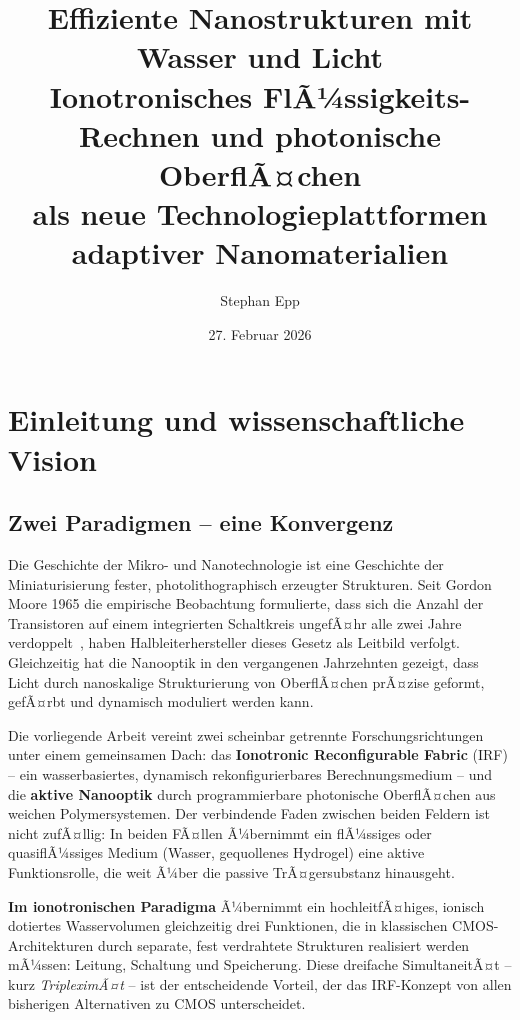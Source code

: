 ﻿\documentclass[a4paper,12pt]{scrreprt}
\title{\textbf{Effiziente Nanostrukturen mit\\ Wasser und Licht}\\[0.8ex]
  \large Ionotronisches FlÃ¼ssigkeits-Rechnen und photonische OberflÃ¤chen\\
  als neue Technologieplattformen adaptiver Nanomaterialien}
\author{Stephan Epp}
\date{27. Februar 2026}
\theoremstyle{definition}
\begin{document}
\maketitle
\tableofcontents
\newpage

\section{Einleitung und wissenschaftliche Vision}

\subsection{Zwei Paradigmen -- eine Konvergenz}

Die Geschichte der Mikro- und Nanotechnologie ist eine Geschichte der
Miniaturisierung fester, photolithographisch erzeugter Strukturen. Seit
Gordon Moore 1965 die empirische Beobachtung formulierte, dass sich die
Anzahl der Transistoren auf einem integrierten Schaltkreis ungefÃ¤hr alle
zwei Jahre verdoppelt~\cite{moore1965}, haben Halbleiterhersteller dieses
Gesetz als Leitbild verfolgt. Gleichzeitig hat die Nanooptik in den
vergangenen Jahrzehnten gezeigt, dass Licht durch nanoskalige Strukturierung
von OberflÃ¤chen prÃ¤zise geformt, gefÃ¤rbt und dynamisch moduliert werden kann.

Die vorliegende Arbeit vereint zwei scheinbar getrennte Forschungsrichtungen
unter einem gemeinsamen Dach: das \textbf{Ionotronic Reconfigurable Fabric}
(IRF) -- ein wasserbasiertes, dynamisch rekonfigurierbares Berechnungsmedium
-- und die \textbf{aktive Nanooptik} durch programmierbare photonische
OberflÃ¤chen aus weichen Polymersystemen. Der verbindende Faden zwischen
beiden Feldern ist nicht zufÃ¤llig: In beiden FÃ¤llen Ã¼bernimmt ein flÃ¼ssiges
oder quasiflÃ¼ssiges Medium (Wasser, gequollenes Hydrogel) eine aktive
Funktionsrolle, die weit Ã¼ber die passive TrÃ¤gersubstanz hinausgeht.

\textbf{Im ionotronischen Paradigma} Ã¼bernimmt ein hochleitfÃ¤higes, ionisch
dotiertes Wasservolumen gleichzeitig drei Funktionen, die in klassischen
CMOS-Architekturen durch separate, fest verdrahtete Strukturen realisiert
werden mÃ¼ssen: Leitung, Schaltung und Speicherung. Diese dreifache
SimultaneitÃ¤t -- kurz \emph{TripleximÃ¤t} -- ist der entscheidende Vorteil,
der das IRF-Konzept von allen bisherigen Alternativen zu CMOS unterscheidet.
\end{document}
